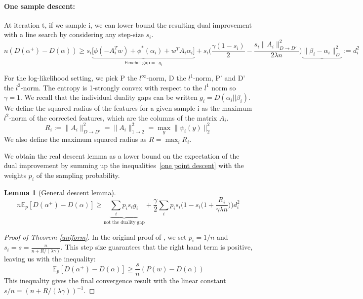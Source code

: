 \documentclass{article}
\DeclareMathOperator{\1}{\mathbb{1}}
\newtheorem{lemma}[theorem]{Lemma}
\begin{document}
\paragraph{One sample descent:} At iteration t, if we sample i, we can lower bound the resulting dual improvement with a line search by considering any step-size $s_i$.
\begin{equation}
	\label{one point descent}
	n (D(\alpha^+) - D(\alpha)) \geq s_i \underbrace{ \big [ \phi(-A_i^Tw) + \phi^*(\alpha_i) + w^T A_i \alpha_i \big ] }_{ \textrm{Fenchel gap} =: g_i} + s_i \bigg ( \frac{\gamma(1-s_i)}{2} - \frac{s_i \|A_i\|^2_{D\rightarrow D'} }{2 \lambda n} \bigg ) \underbrace{\| \beta_i - \alpha_i \|^2_D}{:=d_i^2} 
\end{equation}

For the log-likelihood setting, we pick P the $l^\infty$-norm, D the $l^1$-norm, P' and D' the $l^2$-norm. 
The entropy is 1-strongly convex with respect to the $l^1$ norm so $\gamma = 1$.
We recall that the individual duality gaps can be written $g_i = D(\alpha_i || \beta_i)$.
We define the squared radius of the features for a given sample i as  the maximum $l^2$-norm of the corrected features, which are the columns of the matrix $A_i$.
\begin{equation}
	R_i := \|A_i\|^2_{D\rightarrow D'} = \|A_i\|^2_{1\rightarrow 2} = \max_y \| \psi_i(y)\|_2^2
\end{equation} 
We also define the maximum squared radius as $R=\max_i R_i$.

We obtain the real descent lemma as a lower bound on the expectation of the dual improvement by summing up the inequalities~\eqref{one point descent} with the weights $p_i$ of the sampling probability.

\begin{lemma}[General descent lemma]
	\begin{equation}
		n \mathbb E_p[D(\alpha^+) - D(\alpha)] 
		\geq \underbrace{ \sum_i p_i s_i g_i }_{ \textrm{not the duality gap}} 
		+ \frac{\gamma}{2} \sum_i p_i s_i \bigg ( 1 - s_i \big (1 + \frac{R_i}{\gamma \lambda n} \big ) \bigg ) d_i^2
	\end{equation}
\end{lemma}

\begin{proof}[Proof of Theorem \ref{uniform}]
In the original proof of \cite{shalev-shwartz_accelerated_2013-1}, we set $p_i=1/n$ and $s_i = s = \frac{n}{n+R/(\lambda \gamma)}$. This step size guarantees that the right hand term is positive, leaving us with the inequality:
\begin{equation}
	\mathbb E_p[D(\alpha^+) - D(\alpha)] 
	\geq \frac{s}{n} (P(w) - D(\alpha))
\end{equation}
This inequality gives the final convergence result with the linear constant $s/n = (n+R/(\lambda \gamma))^{-1}$.
\end{proof}
\end{document}
